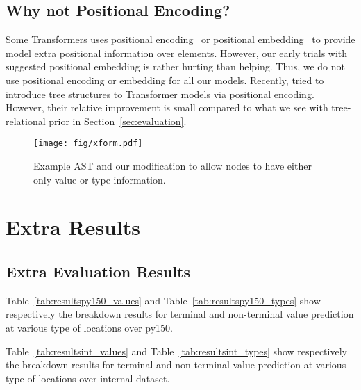 \documentclass[nonacm, sigconf]{acmart}
\newcommand{\tabref}[1]{Table~\ref{#1}}
\begin{document}
\subsection{Why not Positional Encoding?}
\label{sec:posenc}
Some Transformers uses positional encoding~\citep{vaswani2017attention} or positional embedding~\citep{radford2019language-gpt2} to provide model extra positional information over elements. However, our early trials with \LeafSeq suggested positional embedding is rather hurting than helping. Thus, we do not use positional encoding or embedding for all our models.
Recently, \citet{shiv2019novel} tried to introduce tree structures to Transformer models via positional encoding. However, their relative improvement is small compared to what we see with tree-relational prior in Section~\ref{sec:evaluation}.


\begin{figure}
    \centering
    \texttt{[image: fig/xform.pdf]}
    \caption{Example AST and our modification to allow nodes to have either only value or type information.}
    \label{fig:new_ast}
\end{figure}


\section{Extra Results}
\subsection{Extra Evaluation Results}
\label{sec:extra-eval-results}
\tabref{tab:resultspy150_values} and \tabref{tab:resultspy150_types} show respectively the breakdown results for terminal and non-terminal value prediction at various type of locations over py150.

\tabref{tab:resultsint_values} and \tabref{tab:resultsint_types} show respectively the breakdown results for terminal and non-terminal value prediction at various type of locations over internal dataset.
\end{document}

